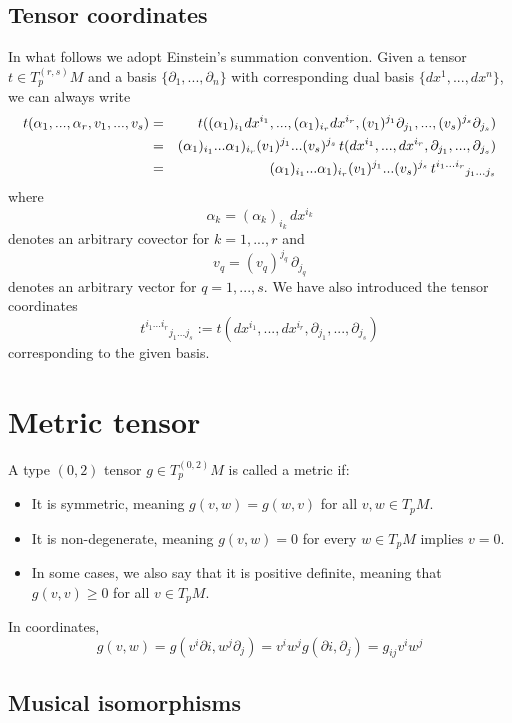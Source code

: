 \documentclass[aps,prl,twocolumn,groupedaddress]{revtex4-2}
\begin{document}
\subsection{Tensor coordinates}

In what follows we adopt Einstein's summation convention.
Given a tensor $t\in T_p^{(r,s)}M$ and a basis $\{\partial_1,...,\partial_n\}$ with corresponding dual basis $\{dx^1,...,dx^n\}$, we can always write
\begin{eqnarray}
t(\alpha_{1},...,\alpha_{r},v_1,...,v_s)
&=&
t((\alpha_{1})_{i_1}dx^{i_1},...,(\alpha_{1})_{i_r}dx^{i_r},(v_1)^{j_1}\partial_{j_1},...,(v_s)^{j_s}\partial_{j_s})
\notag
\\
&=&
(\alpha_{1})_{i_1}...\alpha_{1})_{i_r}(v_1)^{j_1}...(v_s)^{j_s}\,
t(dx^{i_1},...,dx^{i_r},\partial_{j_1},...,\partial_{j_s})
\notag
\\
&=&
(\alpha_{1})_{i_1}...\alpha_{1})_{i_r}(v_1)^{j_1}...(v_s)^{j_s}\,
t^{i_1...i_r}{}_{j_1...j_s}
\notag
\end{eqnarray}
where
$$
\alpha_k = (\alpha_k)_{i_k}\,dx^{i_k}
$$
denotes an arbitrary covector for $k=1,...,r$ and
$$
v_q = (v_q)^{j_q}\,\partial_{j_q}
$$
denotes an arbitrary vector for $q=1,...,s$.
We have also introduced the tensor coordinates
$$
t^{i_1...i_r}{}_{j_1...j_s}
:=
t(dx^{i_1},...,dx^{i_r},\partial_{j_1},...,\partial_{j_s})
$$
corresponding to the given basis.

\section{Metric tensor}

A type $(0,2)$ tensor $g\in T^{(0,2)}_pM$ is called a metric if:
\begin{itemize}
\item It is symmetric, meaning $g(v,w)=g(w,v)$ for all $v,w\in T_pM$.
\item It is non-degenerate, meaning $g(v,w)=0$ for every $w\in T_pM$ implies $v=0$.
\item In some cases, we also say that it is positive definite, meaning that $g(v,v)\geq 0$ for all $v\in T_pM$.
\end{itemize}
In coordinates,
$$
g(v,w)
=
g(v^i\partial i,w^j \partial_j)
=
v^i w^j g(\partial i,\partial_j)
=
g_{ij}v^iw^j
$$

\subsection{Musical isomorphisms}
\end{document}
